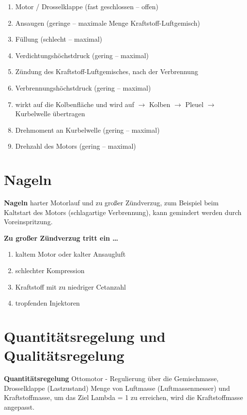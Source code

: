 \begin{enumerate}
\item
  Motor / Drosselklappe (fast geschlossen -- offen)
\item
  Ansaugen (geringe -- maximale Menge Kraftstoff-Luftgemisch)
\item
  Füllung (schlecht -- maximal)
\item
  Verdichtungshöchstdruck (gering -- maximal)
\item
  Zündung des Kraftstoff-Luftgemisches, nach der Verbrennung
\item
  Verbrennungshöchstdruck (gering -- maximal)
\item
  wirkt auf die Kolbenfläche und wird auf $\to$ Kolben $\to$ Pleuel
  $\to$ Kurbelwelle übertragen
\item
  Drehmoment an Kurbelwelle (gering -- maximal)
\item
  Drehzahl des Motors (gering -- maximal)
\end{enumerate}

\section{Nageln}\label{nageln}

\textbf{Nageln} harter Motorlauf und zu großer Zündverzug, zum Beispiel
beim Kaltstart des Motors (schlagartige Verbrennung), kann gemindert
werden durch Voreinspritzung.

\textbf{Zu großer Zündverzug tritt ein \ldots{}}

\begin{enumerate}
\item
  kaltem Motor oder kalter Ansaugluft
\item
  schlechter Kompression
\item
  Kraftstoff mit zu niedriger Cetanzahl
\item
  tropfenden Injektoren
\end{enumerate}

\section{Quantitätsregelung und
Qualitätsregelung}\label{quantitaetsregelung-und-qualitaetsregelung}

\textbf{Quantitätsregelung} Ottomotor - Regulierung über die
Gemischmasse, Drosselklappe (Lastzustand) Menge von Luftmasse
(Luftmassenmesser) und Kraftstoffmasse, um das Ziel Lambda = 1 zu
erreichen, wird die Kraftstoffmasse angepasst.

